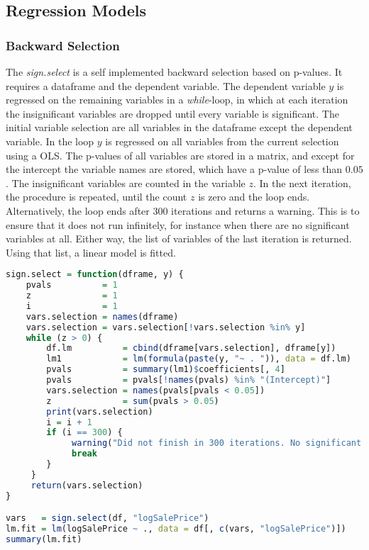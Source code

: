 \subsection{Regression Models}
\subsubsection{Backward Selection}
The \textit{sign.select} is a self implemented backward selection based on p-values. It requires a dataframe and the dependent variable. The dependent variable $y$ is regressed on the remaining variables 
in a  \textit{while}-loop, in which at each iteration the insignificant variables
are dropped until every variable is significant. 
The initial variable selection are all variables in the dataframe except the dependent variable. 
In the loop $y$ is regressed on all variables from the current selection using a OLS. The p-values of all variables are stored in a matrix, and except
for the intercept the variable names are stored, which have a p-value
of less than $0.05$. The insignificant variables are counted in the variable $z$.  In the next iteration, the procedure is repeated,
until the count $z$  is zero and the loop
ends. Alternatively, the loop ends after 300 iterations and returns a warning. This is to ensure
that it does not run infinitely, for instance when there are no significant variables at all. 
Either way, the list of variables of the last iteration is returned. Using that list,  a linear model is fitted. 


\begin{lstlisting}[language=R]
sign.select = function(dframe, y) {
    pvals          = 1
    z              = 1
    i              = 1
    vars.selection = names(dframe)
    vars.selection = vars.selection[!vars.selection %in% y]
    while (z > 0) {
        df.lm          = cbind(dframe[vars.selection], dframe[y])
        lm1            = lm(formula(paste(y, "~ . ")), data = df.lm)
        pvals          = summary(lm1)$coefficients[, 4]
        pvals          = pvals[!names(pvals) %in% "(Intercept)"]
        vars.selection = names(pvals[pvals < 0.05])
        z              = sum(pvals > 0.05)
        print(vars.selection)
        i = i + 1
        if (i == 300) {
             warning("Did not finish in 300 iterations. No significant variables in data set?")
             break
        }
     }
     return(vars.selection)
}

vars   = sign.select(df, "logSalePrice")
lm.fit = lm(logSalePrice ~ ., data = df[, c(vars, "logSalePrice")])
summary(lm.fit)
\end{lstlisting}
